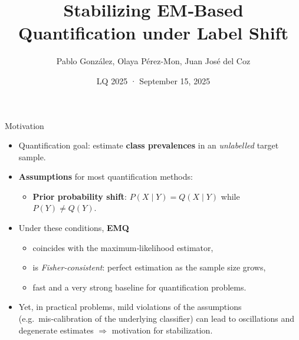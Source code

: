 \documentclass[aspectratio=169]{beamer}
\title[Stabilizing EM‑Based Quantification]{Stabilizing EM‑Based Quantification under Label Shift}
\author{Pablo González, Olaya Pérez-Mon, Juan José del Coz}
\institute[AI Center, Uni. Oviedo]{Artificial Intelligence Center\\University of Oviedo}
\date{LQ 2025 · September 15, 2025}
\begin{document}
\begin{frame}
  \titlepage
\end{frame}

\begin{frame}{Motivation}
  \begin{itemize}
    \item \alert{Quantification goal}: estimate \textbf{class prevalences} in an \emph{unlabelled} target sample.
    \item \textbf{Assumptions} for most quantification methods:
          \begin{itemize}
            \item \textbf{Prior probability shift}: $P(X\mid Y)=Q(X\mid Y)$ while $P(Y)\neq Q(Y)$.
          \end{itemize}
    \item Under these conditions,  \textbf{EMQ}
          \begin{itemize}
            \item coincides with the maximum‑likelihood estimator,
            \item is \emph{Fisher‑consistent}: perfect estimation as the sample size grows,
            \item fast and a very strong baseline for quantification problems.
          \end{itemize}
    \item Yet, in practical problems, mild violations of the assumptions (e.g.\ mis‑calibration of the underlying classifier) can lead to oscillations and degenerate estimates $\Rightarrow$ motivation for stabilization.
  \end{itemize}
\end{frame}
\end{document}
